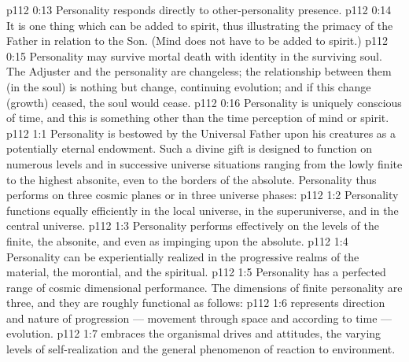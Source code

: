\vs p112 0:13 \bibnobreakspace Personality responds directly to other\hyp{}personality presence.
\vs p112 0:14 \bibnobreakspace It is one thing which can be added to spirit, thus illustrating the primacy of the Father in relation to the Son. (Mind does not have to be added to spirit.)
\vs p112 0:15 \bibnobreakspace Personality may survive mortal death with identity in the surviving soul. The Adjuster and the personality are changeless; the relationship between them (in the soul) is nothing but change, continuing evolution; and if this change (growth) ceased, the soul would cease.
\vs p112 0:16 \bibnobreakspace Personality is uniquely conscious of time, and this is something other than the time perception of mind or spirit.
\vs p112 1:1 Personality is bestowed by the Universal Father upon his creatures as a potentially eternal endowment. Such a divine gift is designed to function on numerous levels and in successive universe situations ranging from the lowly finite to the highest absonite, even to the borders of the absolute. Personality thus performs on three cosmic planes or in three universe phases:
\vs p112 1:2 \bibnobreakspace {} Personality functions equally efficiently in the local universe, in the superuniverse, and in the central universe.
\vs p112 1:3 \bibnobreakspace {} Personality performs effectively on the levels of the finite, the absonite, and even as impinging upon the absolute.
\vs p112 1:4 \bibnobreakspace {} Personality can be experientially realized in the progressive realms of the material, the morontial, and the spiritual.
\vs p112 1:5 \pc Personality has a perfected range of cosmic dimensional performance. The dimensions of finite personality are three, and they are roughly functional as follows:
\vs p112 1:6 \bibnobreakspace {} represents direction and nature of progression --- movement through space and according to time --- evolution.
\vs p112 1:7 \bibnobreakspace {} embraces the organismal drives and attitudes, the varying levels of self\hyp{}realization and the general phenomenon of reaction to environment.
